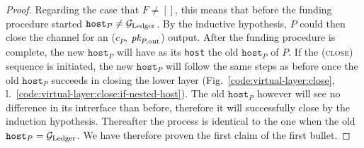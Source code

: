 \begin{proof}
  Regarding the case that $F \neq []$, this means that before the funding
  procedure started $\texttt{host}_P \neq \mathcal{G}_{\mathrm{Ledger}}$. By the inductive hypothesis,
  $P$ could then close the channel for an ($c_P$, $\textit{pk}_{P, \mathrm{out}}$)
  output. After the funding procedure is complete, the new $\texttt{host}_P$
  will have as its \texttt{host} the old $\texttt{host}_P$ of $P$. If the
  (\textsc{close}) sequence is initiated, the new $\texttt{host}_P$ will follow
  the same steps as before once the old $\texttt{host}_P$ succeeds in closing
  the lower layer (Fig.~\ref{code:virtual-layer:close},
  l.~\ref{code:virtual-layer:close:if-nested-host}). The old $\texttt{host}_P$
  however will see no difference in its intrerface than before, therefore it
  will successfully close by the induction hypothesis. Thereafter the process is
  identical to the one when the old $\texttt{host}_P = \mathcal{G}_{\mathrm{Ledger}}$. We have
  therefore proven the first claim of the first bullet.
\end{proof}

